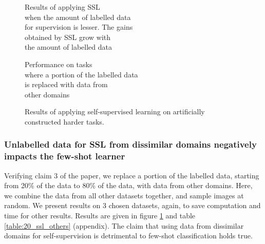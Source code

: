 \begin{figure}[t]
  \centering
    \begin{minipage}{0.48\textwidth}
      \centering
        \caption{Results of applying SSL \\ when the amount of labelled data \\ for supervision is lesser. The gains \\ obtained by SSL grow with \\ the amount of labelled data}
        \label{fig:20-40-60-80}
    \end{minipage}\hfill
    \begin{minipage}{0.48\textwidth}
      \centering
        \caption{Performance on tasks \\ where a portion of the labelled data \\ is replaced with data from \\ other domains}
        \label{fig:20-60-other}
      \end{minipage}
    \end{figure}

\begin{figure}
      \centering
        \caption{Results of applying self-supervised learning on artificially constructed harder tasks.}
        \label{fig:lowres}
\end{figure}

\subsubsection{Unlabelled data for SSL from dissimilar domains negatively impacts the few-shot learner}

Verifying claim $3$ of the paper, we replace a portion of the labelled data, starting from 20\% of the data to 80\% of the data, with data from other domains. Here, we combine the data from all other datasets together, and sample images at random. We present results on $3$ chosen datasets, again, to save computation and time for other results. Results are given in figure \ref{fig:20-60-other} and table \ref{table:20_ssl_others} (appendix). The claim that using data from dissimilar domains for self-supervision is detrimental to few-shot classification holds true.

